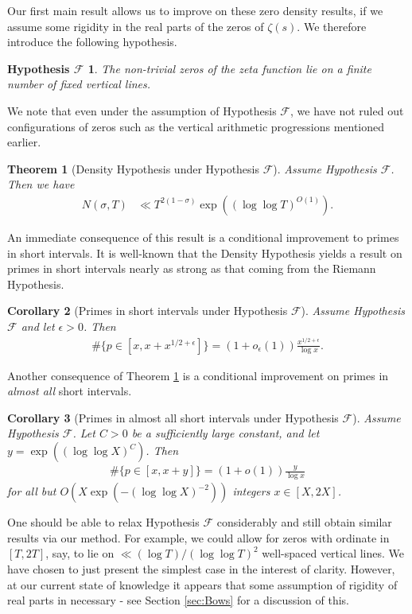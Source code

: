 \documentclass[12pt]{amsart}
\theoremstyle{plain}
\newtheorem{theorem}{Theorem}
\newtheorem*{hypothesisF}{Hypothesis $\mathcal{F}$}
\newtheorem{corollary}[theorem]{Corollary}
\theoremstyle{definition}
\theoremstyle{remark}
\begin{document}
Our first main result allows us to improve on these zero density results, if we assume some rigidity in the real parts of the zeros of $\zeta(s)$. We therefore introduce the following hypothesis.
%
%
%
%
\begin{hypothesisF}
The non-trivial zeros of the zeta function lie on a finite number of fixed vertical lines.
\end{hypothesisF}
%
%
%
%
We note that even under the assumption of Hypothesis $\mathcal{F}$, we have not ruled out configurations of zeros such as the vertical arithmetic progressions mentioned earlier.
%
%
%
%
\begin{theorem}[Density Hypothesis under Hypothesis $\mathcal{F}$]\label{thm:ZeroDensity}
Assume Hypothesis $\mathcal{F}$. Then we have 
\begin{align*}
N(\sigma,T) &\ll T^{2(1-\sigma)} \exp((\log \log T)^{O(1)}).
\end{align*}
\end{theorem}
%
%
%
%
An immediate consequence of this result is a conditional improvement to primes in short intervals. It is well-known that the Density Hypothesis yields a result on primes in short intervals nearly as strong as that coming from the Riemann Hypothesis.
%
%
%
%
\begin{corollary}[Primes in short intervals under Hypothesis $\mathcal{F}$]\label{cor:ShortIntervals}
Assume Hypothesis $\mathcal{F}$ and let $\epsilon>0$. Then
\begin{align*}
\#\{p\in [x,x+x^{1/2+\epsilon}]\}=(1+o_\epsilon(1))\frac{x^{1/2+\epsilon}}{\log{x}}.
\end{align*}
\end{corollary}
%
%
%
%
Another consequence of Theorem \ref{thm:ZeroDensity} is a conditional improvement on primes in \emph{almost all} short intervals.
%
%
%
%
\begin{corollary}[Primes in almost all short intervals under Hypothesis $\mathcal{F}$]\label{cor:AlmostAllShortIntervals}
Assume Hypothesis $\mathcal{F}$. Let $C>0$ be a sufficiently large constant, and let $y = \exp((\log \log X)^C)$. Then
\begin{align*}
\#\{p\in [x,x+y]\}=(1+o(1))\frac{y}{\log{x}}
\end{align*}
for all but $O(X\exp(-(\log\log X)^{-2}))$ integers $x \in [X,2X]$.
\end{corollary}
%
%
%
%
One should be able to relax Hypothesis $\mathcal{F}$ considerably and still obtain similar results via our method. For example, we could allow for zeros with ordinate in $[T,2T]$, say, to lie on $\ll (\log T)/(\log \log T)^2$ well-spaced vertical lines. We have chosen to just present the simplest case in the interest of clarity. However, at our current state of knowledge it appears that some assumption of rigidity of real parts in necessary - see Section \ref{sec:Bows} for a discussion of this.
\end{document}

